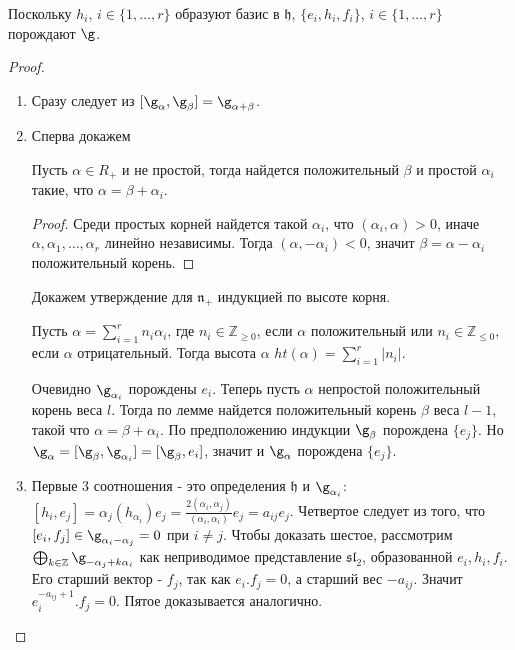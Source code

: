 \documentclass[a4article]{article}
\begin{document}
\begin{remark}
    Поскольку $h_i$, $i \in \{1, \ldots, r\}$ образуют базис в $\mathfrak{h}$, $\{e_i, h_i, f_i\}$, $i \in \{1, \ldots, r\}$ порождают $\g$.
\end{remark}
\begin{proof}
    \begin{enumerate}
        \item Сразу следует из $[\g_{\alpha}, \g_{\beta}] = \g_{\alpha + \beta}$.
        \item Сперва докажем
        \begin{lemma}
            Пусть $\alpha \in R_{+}$ и не простой, тогда найдется положительный $\beta$ и простой $\alpha_i$ такие, что $\alpha = \beta + \alpha_i$.
        \end{lemma}
        \begin{proof}
            Среди простых корней найдется такой $\alpha_i$, что $(\alpha_i, \alpha) > 0$, иначе $\alpha, \alpha_1, \ldots, \alpha_r$ линейно независимы. Тогда $(\alpha, -\alpha_i) < 0$, значит $\beta = \alpha - \alpha_i$ положительный корень.
        \end{proof}
        Докажем утверждение для $\mathfrak{n}_{+}$ индукцией по высоте корня.
        \begin{definition}
            Пусть $\alpha = \sum_{i=1}^{r}n_i\alpha_i$, где $n_i \in \mathbb{Z}_{\ge 0}$, если $\alpha$ положительный или $n_i \in \mathbb{Z}_{\le 0}$, если $\alpha$ отрицательный. Тогда высота $\alpha$ $ht(\alpha) = \sum_{i=1}^{r}|n_i|$.
        \end{definition}
        Очевидно $\g_{\alpha_i}$ порождены $e_i$. Теперь пусть $\alpha$ непростой положительный корень веса $l$. Тогда по лемме найдется положительный корень $\beta$ веса $l-1$, такой что $\alpha = \beta + \alpha_i$. По предположению индукции $\g_{\beta}$ порождена $\{e_j\}$. Но $\g_{\alpha} = [\g_{\beta}, \g_{\alpha_i}]=[\g_{\beta}, e_i]$, значит и $\g_{\alpha}$ порождена $\{e_j\}$.
        \item Первые 3 соотношения - это определения $\mathfrak{h}$ и $\g_{\alpha_i}$: $[h_i, e_j]=\alpha_j(h_{\alpha_i})e_j=\frac{2(\alpha_i, \alpha_j)}{(\alpha_i, \alpha_i)}e_j=a_{ij}e_j$. Четвертое следует из того, что $[e_i, f_j] \in \g_{\alpha_i - \alpha_j} = 0$ при $i \ne j$. Чтобы доказать шестое, рассмотрим $\bigoplus_{k \in \mathbb{Z}} \g_{-\alpha_j + k\alpha_i}$ как неприводимое представление $\mathfrak{sl}_2$, образованной $e_i, h_i, f_i$. Его старший вектор - $f_j$, так как $e_i.f_j = 0$, а старший вес $-a_{ij}$. Значит $e_i^{-a_{ij}+1}.f_j=0$. Пятое доказывается аналогично.
    \end{enumerate}
\end{proof}
\end{document}
